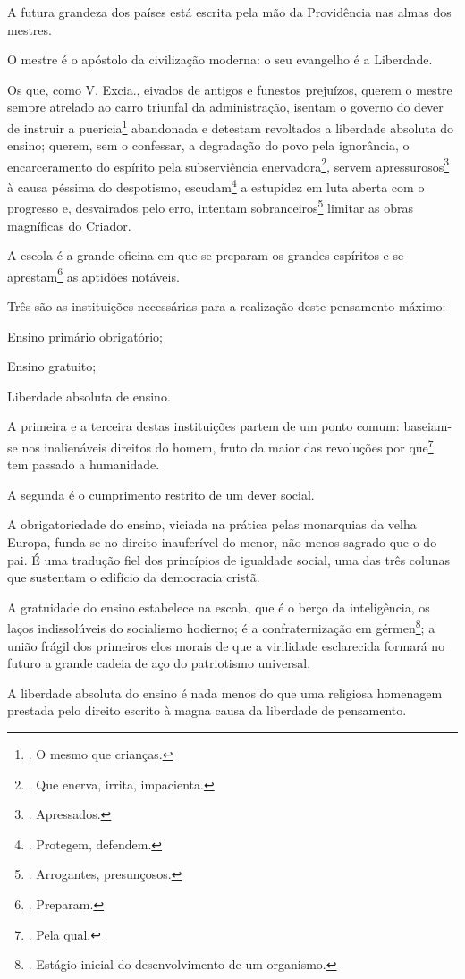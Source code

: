 A futura grandeza dos países está escrita pela mão da Providência nas
almas dos mestres.

O mestre é o apóstolo da civilização moderna: o seu evangelho é a
Liberdade.

Os que, como V. Excia., eivados de antigos e funestos prejuízos, querem
o mestre sempre atrelado ao carro triunfal da administração, isentam o
governo do dever de instruir a puerícia\footnote{. O mesmo que crianças.}
abandonada e detestam revoltados a liberdade absoluta do ensino; querem,
sem o confessar, a degradação do povo pela ignorância, o encarceramento
do espírito pela subserviência enervadora\footnote{. Que enerva, irrita,
  impacienta.}, servem apressurosos\footnote{. Apressados.} à causa
péssima do despotismo, escudam\footnote{. Protegem, defendem.} a
estupidez em luta aberta com o progresso e, desvairados pelo erro,
intentam sobranceiros\footnote{. Arrogantes, presunçosos.} limitar as
obras magníficas do Criador.

A escola é a grande oficina em que se preparam os grandes espíritos e se
aprestam\footnote{. Preparam.} as aptidões notáveis.

Três são as instituições necessárias para a realização deste pensamento
máximo:

Ensino primário obrigatório;

Ensino gratuito;

Liberdade absoluta de ensino.

A primeira e a terceira destas instituições partem de um ponto comum:
baseiam-se nos inalienáveis direitos do homem, fruto da maior das
revoluções por que\footnote{. Pela qual.} tem passado a humanidade.

A segunda é o cumprimento restrito de um dever social.

A obrigatoriedade do ensino, viciada na prática pelas monarquias da
velha Europa, funda-se no direito inauferível do menor, não menos
sagrado que o do pai. É uma tradução fiel dos princípios de igualdade
social, uma das três colunas que sustentam o edifício da democracia
cristã.

A gratuidade do ensino estabelece na escola, que é o berço da
inteligência, os laços indissolúveis do socialismo hodierno; é a
confraternização em gérmen\footnote{. Estágio inicial do desenvolvimento
  de um organismo.}; a união frágil dos primeiros elos morais de que a
virilidade esclarecida formará no futuro a grande cadeia de aço do
patriotismo universal.

A liberdade absoluta do ensino é nada menos do que uma religiosa
homenagem prestada pelo direito escrito à magna causa da liberdade de
pensamento.

